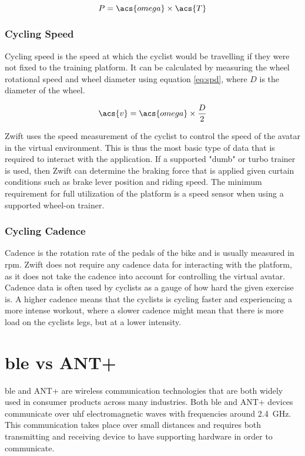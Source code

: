 \begin{equation}
	P = \acs{omega} \times \acs{T}
	\label{eq:pow}
\end{equation}

\subsubsection{Cycling Speed}
Cycling speed is the speed at which the cyclist would be travelling if they were not fixed to the training platform. It can be calculated by measuring the wheel rotational speed and wheel diameter using equation \ref{eq:spd}, where $D$ is the diameter of the wheel.

\begin{equation}
	\acs{v} = \acs{omega} \times \frac{D}{2}
	\label{eq:spd}
\end{equation}

Zwift uses the speed measurement of the cyclist to control the speed of the avatar in the virtual environment. This is thus the most basic type of data that is required to interact with the application. If a supported "dumb" or turbo trainer is used, then Zwift can determine the braking force that is applied given curtain conditions such as brake lever position and riding speed.
The minimum requirement for full utilization of the platform is a speed sensor when using a supported wheel-on trainer.

\subsubsection{Cycling Cadence}
Cadence is the rotation rate of the pedals of the bike and is usually measured in \ac{rpm}. Zwift does not require any cadence data for interacting with the platform, as it does not take the cadence into account for controlling the virtual avatar. Cadence data is often used by cyclists as a gauge of how hard the given exercise is. A higher cadence means that the cyclists is cycling faster and experiencing a more intense workout, where a slower cadence might mean that there is more load on the cyclists legs, but at a lower intensity.



\section{\ac{ble} vs ANT+}
\label{sec:ant}

\ac{ble} and ANT+ are wireless communication technologies that are both widely used in consumer products across many industries. Both \ac{ble} and ANT+ devices communicate over \ac{uhf} electromagnetic waves with frequencies around \SI{2.4}{\giga\hertz}. This communication takes place over small distances and requires both transmitting and receiving device to have supporting hardware in order to communicate.

